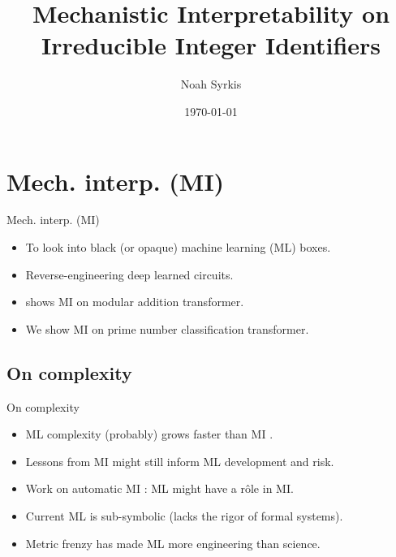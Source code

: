 \documentclass[aspectratio=32]{beamer}
\title{Mechanistic Interpretability on Irreducible Integer Identifiers}
\date{\mydate\today}
\author{Noah Syrkis}
\providecommand{\tightlist}{\setlength{\itemsep}{0pt}\setlength{\parskip}{0pt}}
\begin{document}
  \ifthenelse{\equal{\inserttitle}{}}{}{%
  \begin{frame}[allowframebreaks]
    \titlepage
  \end{frame}
  }


  \section{\textbar{} Mech. interp. (MI)}\label{mech.-interp.-mi}

  \begin{frame}[allowframebreaks]{\textbar{} Mech. interp. (MI)}
  \begin{itemize}
  \tightlist
  \item
    To look into black (or opaque) machine learning (ML) boxes.
  \item
    Reverse-engineering deep learned circuits.
  \item
    \textcite{nanda2023} shows MI on modular addition transformer.
  \item
    We show MI on prime number classification transformer.
  \end{itemize}
  \end{frame}

  \subsection{\textbar{} On complexity}\label{on-complexity}

  \begin{frame}{\textbar{} On complexity}
  \begin{itemize}[<+->]
  \tightlist
  \item
    ML complexity (probably) grows faster than MI \autocite{sarkar2022}.
  \item
    Lessons from MI might still inform ML development and risk.
  \item
    Work on automatic MI \autocite{conmy2023}: ML might have a rôle in
    MI.
  \item
    Current ML is sub-symbolic (lacks the rigor of formal systems).
  \item
    Metric frenzy has made ML more engineering than science.
  \end{itemize}
  \end{frame}
\end{document}

